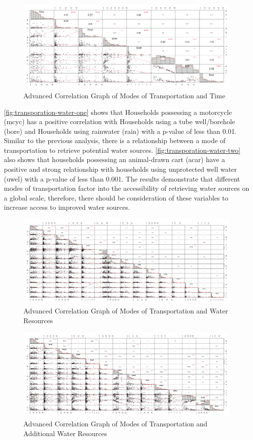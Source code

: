 \documentclass[10pt,twoside]{article}
\numberwithin{equation}{section}
\newcommand{\?}{\stackrel{?}{=}}
\begin{document}
\begin{figure}[h!]
  \centering
  \includegraphics[width=.7\textwidth]{transportation-time}
  \caption{Advanced Correlation Graph of Modes of Transportation and Time}
  \label{fig:transporation-time}
\end{figure}
\autoref{fig:transporation-water-one} shows that Households possessing a motorcycle (mcyc) has a positive correlation with Households using a tube well/borehole (bore) and Households using rainwater (rain) with a p-value of less than 0.01. Similar to the previous analysis, there is a relationship between a mode of transportation to retrieve potential water sources. \autoref{fig:transporation-water-two} also shows that households possessing an animal-drawn cart (acar) have a positive and strong relationship with households using unprotected well water (uwel) with a p-value of less than 0.001. The results demonstrate that different modes of transportation factor into the accessibility of retrieving water sources on a global scale, therefore, there should be consideration of these variables to increase access to improved water sources. 
\begin{figure}[h!]
  \centering
  \includegraphics[width=.7\textwidth]{transportation-water-1}
  \caption{Advanced Correlation Graph of Modes of Transportation and Water Resources}
  \label{fig:transporation-water-one}
\end{figure}

\begin{figure}[h!]
  \centering
  \includegraphics[width=.7\textwidth]{transportation-water-2}
  \caption{Advanced Correlation Graph of Modes of Transportation and Additional Water Resources}
  \label{fig:transporation-water-two}
\end{figure}
\end{document}
